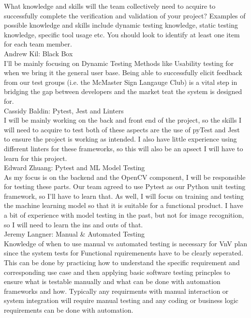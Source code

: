 \documentclass[12pt, titlepage]{article}
\begin{document}
\begin{outline}[enumerate]
  \1 What knowledge and skills will the team collectively need to acquire to
  successfully complete the verification and validation of your project?
  Examples of possible knowledge and skills include dynamic testing knowledge,
  static testing knowledge, specific tool usage etc.  You should look to
  identify at least one item for each team member.\\
    \2 Andrew Kil: Black Box\\
    I'll be mainly focusing on Dynamic Testing Methods like Usability testing for when we bring it the general user base. Being able to successfully elicit feedback from our test groups (i.e. the McMaster Sign Langauge Club) is a vital step in bridging the gap between developers and the market teat the system is designed for.\\
    \2 Cassidy Baldin: Pytest, Jest and Linters\\
    I will be mainly working on the back and front end of the project, so the skills I will need to acquire to test both of these aspects are the use of pyTest and Jest to ensure the project is working as intended. I also have little experience using different linters for these frameworks, so this will also be an apsect I will have to learn for this project.\\
    \2 Edward Zhuang: Pytest and ML Model Testing\\
    As my focus is on the backend and the OpenCV component, I will be responsible for testing these parts. Our team agreed to use Pytest as our Python unit testing framework, so I'll have to learn that. As well, I will focus on training and testing the machine learning model so that it is suitable for a functional product. I have a bit of experience with model testing in the past, but not for image recognition, so I will need to learn the ins and outs of that.\\
    \2 Jeremy Langner: Manual \& Automated Testing \\
    Knowledge of when to use manual vs automated testing is necessary for VnV plan since the system tests for Functional rquiremenents have to be clearly seperated. This can be done by practicing how to understand the specific requirement and corresponding use case and then applying basic software testing princples to ensure what is testable manually and what can be done with automation frameworks and how. Typically any requirments with manual interaction or system integration will require manual testing and any coding or business logic requirements can be done with automation.\\

\end{outline}
\end{document}
